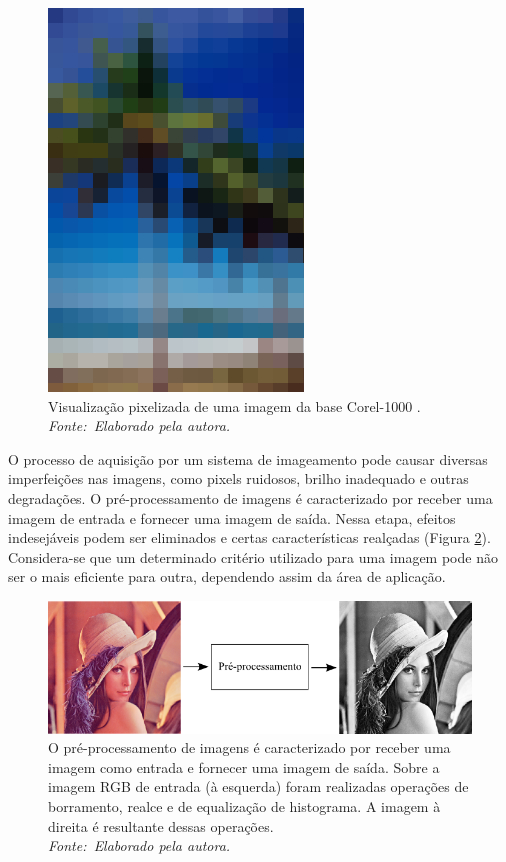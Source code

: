 \begin{figure}[!htbp]
 \begin{center}
   \includegraphics[width=0.4\linewidth]{figuras/pixel.jpg}
 \caption[Visualização pixelizada de uma imagem da base Corel-1000.]{Visualização pixelizada de uma imagem da base Corel-1000 \cite{Wang2001}. \\ \textit{Fonte:~Elaborado pela autora.}}
 \label{fig:pixel}
 \end{center}
\end{figure}

O processo de aquisição por um sistema de imageamento pode causar diversas imperfeições nas imagens, como pixels ruidosos, brilho inadequado e outras degradações. O pré-processamento de imagens é caracterizado por receber uma imagem de entrada e fornecer uma imagem de saída. Nessa etapa, efeitos indesejáveis podem ser eliminados e certas características realçadas (Figura \ref{fig:preproc}). Considera-se que um determinado critério utilizado para uma imagem pode não ser o mais eficiente para outra, dependendo assim da área de aplicação.

\vspace{12pt}
\begin{figure}[!htbp]
 \begin{center}
   \includegraphics[width=1\linewidth]{figuras/preprocessamento.png}
 \caption[Sobre a imagem RGB de entrada foram realizadas operações de borramento, realce e de equalização de histograma. A imagem à direita é resultante dessas operações.]{O pré-processamento de imagens é caracterizado por receber uma imagem como entrada e fornecer uma imagem de saída. Sobre a imagem RGB de entrada (à esquerda) foram realizadas operações de borramento, realce e de equalização de histograma. A imagem à direita é resultante dessas operações. \\ \textit{Fonte:~Elaborado pela autora.}}
 \label{fig:preproc}
 \end{center}
\end{figure}

